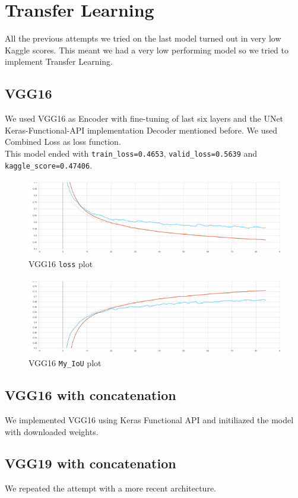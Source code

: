 \documentclass{article}
\begin{document}
	\section{Transfer Learning}
		
		All the previous attempts we tried on the last model turned out in very low Kaggle scores. This meant we had a very low performing model so we tried to implement Transfer Learning.
		
		\subsection{VGG16}
			
			We used VGG16 as Encoder with fine-tuning of last six layers and the UNet Keras-Functional-API implementation Decoder mentioned before. We used Combined Loss as loss function. \\
			This model ended with \texttt{train\_loss=0.4653}, \texttt{valid\_loss=0.5639} and \texttt{kaggle\_score=0.47406}.
			
		\begin{figure}[H]
			\centering
			\includegraphics[height=3.4cm, keepaspectratio]{VGG16_Dec14_16-52-56_epoch_loss.jpg}
			\caption{VGG16 \texttt{loss} plot}
		\end{figure}
	
		\begin{figure}[H]
			\centering
			\includegraphics[height=3.4cm, keepaspectratio]{VGG16_Dec14_16-52-56_epoch_my_IoU}
			\caption{VGG16 \texttt{My\_IoU} plot}
		\end{figure}
			
		\subsection{VGG16 with concatenation}
					
			We implemented VGG16 using Keras Functional API and initiliazed the model with downloaded weights. 
		
		\subsection{VGG19 with concatenation}
		
			We repeated the attempt with a more recent architecture.
			
			
\end{document}

